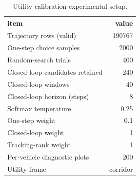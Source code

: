 \begin{table}[t]
\centering
\caption{Utility calibration experimental setup.}
\label{tab:utility_calibration_setup}
\begin{tabular}{lr}
\toprule
item & value \\
\midrule
Trajectory rows (valid) & 190767 \\
One-step choice samples & 2000 \\
Random-search trials & 400 \\
Closed-loop candidates retained & 240 \\
Closed-loop windows & 40 \\
Closed-loop horizon (steps) & 8 \\
Softmax temperature & 0.25 \\
One-step weight & 0.1 \\
Closed-loop weight & 1 \\
Tracking-rank weight & 1 \\
Per-vehicle diagnostic plots & 200 \\
Utility frame & corridor \\
\bottomrule
\end{tabular}
\end{table}
